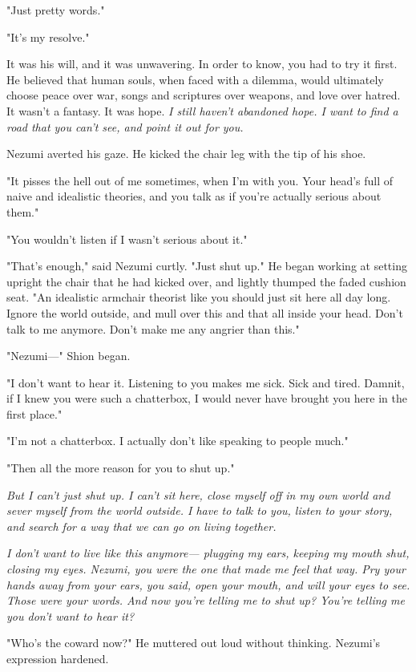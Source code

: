 "Just pretty words."

"It's my resolve."

It was his will, and it was unwavering. In order to know, you had to try
it first. He believed that human souls, when faced with a dilemma, would
ultimately choose peace over war, songs and scriptures over weapons, and
love over hatred. It wasn't a fantasy. It was hope. \emph{I still haven't
abandoned hope. I want to find a road that you can't see, and point it
out for you.}

Nezumi averted his gaze. He kicked the chair leg with the tip of his
shoe.

"It pisses the hell out of me sometimes, when I'm with you. Your head's
full of naive and idealistic theories, and you talk as if you're
actually serious about them."

"You wouldn't listen if I wasn't serious about it."

"That's enough," said Nezumi curtly. "Just shut up." He began working at
setting upright the chair that he had kicked over, and lightly thumped
the faded cushion seat. "An idealistic armchair theorist like you should
just sit here all day long. Ignore the world outside, and mull over this
and that all inside your head. Don't talk to me anymore. Don't make me
any angrier than this."

"Nezumi---" Shion began.

"I don't want to hear it. Listening to you makes me sick. Sick and
tired. Damnit, if I knew you were such a chatterbox, I would never have
brought you here in the first place."

"I'm not a chatterbox. I actually don't like speaking to people much."

"Then all the more reason for you to shut up."

\emph{But I can't just shut up. I can't sit here, close myself off in my own
world and sever myself from the world outside. I have to talk to you,
listen to your story, and search for a way that we can go on living
together.}

\emph{I don't want to live like this anymore--- plugging my ears, keeping my
mouth shut, closing my eyes. Nezumi, you were the one that made me feel
that way. Pry your hands away from your ears, you said, open your mouth,
and will your eyes to see. Those were your words. And now you're telling
me to shut up? You're telling me you don't want to hear it?}

"Who's the coward now?" He muttered out loud without thinking. Nezumi's
expression hardened.

